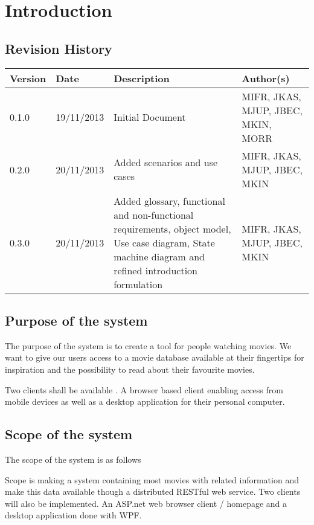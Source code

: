 \chapter{Introduction}
\label{sec:introduction}

\section{Revision History}
\begin{center}
    \begin{tabular}{ | l | l | p{6cm} | p{4cm} |}
    \hline
    Version & Date & Description & Author(s) \\ \hline
    0.1.0 & 19/11/2013 & Initial Document & MIFR, JKAS, MJUP, JBEC, MKIN, MORR
    \\ \hline
    0.2.0 & 20/11/2013 & Added scenarios and use cases & MIFR, JKAS, MJUP, JBEC, MKIN
    \\ \hline
    0.3.0 & 20/11/2013 & Added glossary, functional and non-functional requirements, object model, Use case diagram, State machine diagram and refined introduction formulation & MIFR, JKAS, MJUP, JBEC, MKIN
    \\ \hline
    \end{tabular}
\end{center}

\section{Purpose of the system}

The purpose of the system is to create a tool for people watching movies. We want to give our users access to a movie database available at their fingertips for inspiration and the possibility to read about their favourite movies.

Two clients shall be available . A browser based client enabling access from mobile devices as well as a desktop application for their personal computer.  




\section{Scope of the system}

The scope of the system is as follows

Scope is making a system containing most movies with related information and make this data available though a distributed RESTful web service. Two clients will also be implemented. An ASP.net web browser client / homepage and a desktop application done with WPF.

